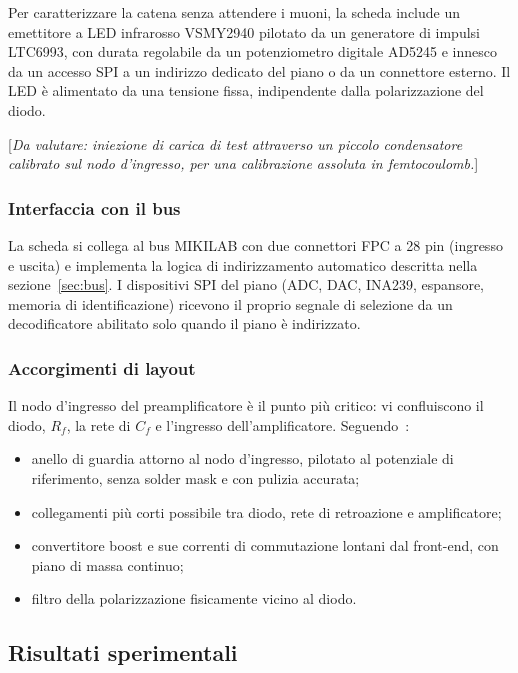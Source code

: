 \documentclass[11pt,a4paper]{article}
\newcommand{\dadefinire}[1]{\textcolor{red!70!black}{[\emph{#1}]}}
\begin{document}
Per caratterizzare la catena senza attendere i muoni, la scheda include un emettitore a LED infrarosso VSMY2940 pilotato da un generatore di impulsi LTC6993, con durata regolabile da un potenziometro digitale AD5245 e innesco da un accesso SPI a un indirizzo dedicato del piano o da un connettore esterno. Il LED è alimentato da una tensione fissa, indipendente dalla polarizzazione del diodo.

\dadefinire{Da valutare: iniezione di carica di test attraverso un piccolo condensatore calibrato sul nodo d'ingresso, per una calibrazione assoluta in femtocoulomb.}

\subsubsection{Interfaccia con il bus}

La scheda si collega al bus MIKILAB con due connettori FPC a 28 pin (ingresso e uscita) e implementa la logica di indirizzamento automatico descritta nella sezione~\ref{sec:bus}. I dispositivi SPI del piano (ADC, DAC, INA239, espansore, memoria di identificazione) ricevono il proprio segnale di selezione da un decodificatore abilitato solo quando il piano è indirizzato.

\subsubsection{Accorgimenti di layout}

Il nodo d'ingresso del preamplificatore è il punto più critico: vi confluiscono il diodo, $R_f$, la rete di $C_f$ e l'ingresso dell'amplificatore. Seguendo~\cite{spieler2005,ott2009}:
\begin{itemize}
  \item anello di guardia attorno al nodo d'ingresso, pilotato al potenziale di riferimento, senza solder mask e con pulizia accurata;
  \item collegamenti più corti possibile tra diodo, rete di retroazione e amplificatore;
  \item convertitore boost e sue correnti di commutazione lontani dal front-end, con piano di massa continuo;
  \item filtro della polarizzazione fisicamente vicino al diodo.
\end{itemize}

\subsection{Risultati sperimentali}\label{sec:dati}
\end{document}
